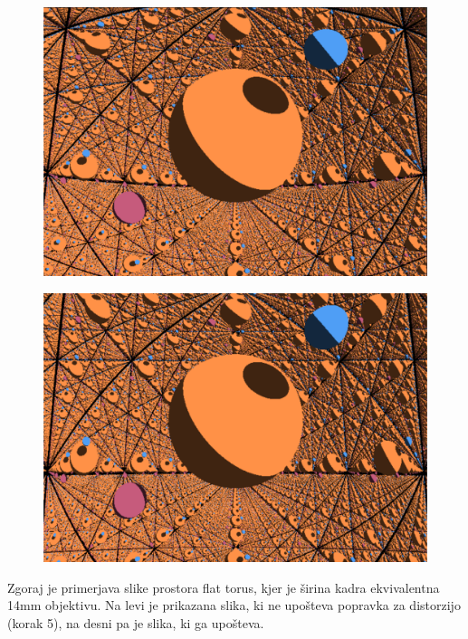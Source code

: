 \documentclass[titlepage]{article}
\begin{document}
\begin{figure}[H]
  \centering
  \begin{minipage}[t]{.5\textwidth}
    \centering
    \includegraphics[width=1\linewidth]{Images/Flat_torus_14mm_distorted.png}
    \label{fig:Torus distorted}
  \end{minipage}%
  \begin{minipage}[t]{.5\textwidth}
    \centering
    \includegraphics[width=1\linewidth]{Images/Flat_torus_14mm_undistorted.png}
    \label{fig:Torus undistorted}
  \end{minipage}
  \end{figure}

Zgoraj je primerjava slike prostora flat torus, kjer je širina kadra ekvivalentna 14mm objektivu. Na levi je 
prikazana slika, ki ne upošteva popravka za distorzijo (korak 5), na desni pa je slika, ki ga upošteva.
\end{document}
